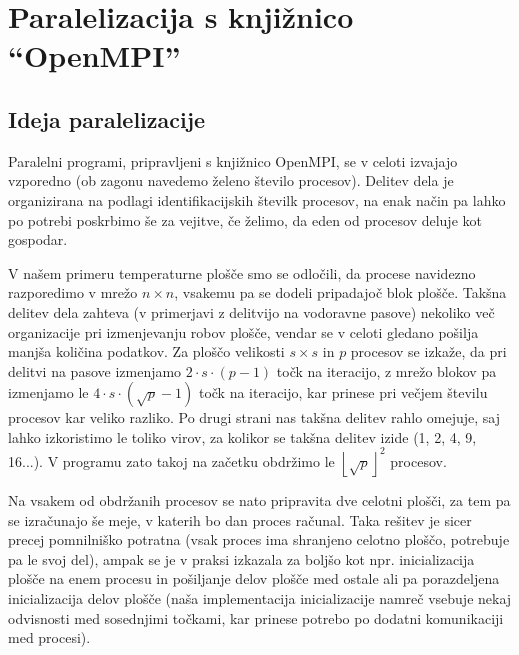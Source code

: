\documentclass[a4paper,titlepage,11pt]{article}
\begin{document}
\pagebreak

\section{Paralelizacija s knjižnico ``OpenMPI''}
\label{poglavje-mpi}

\subsection{Ideja paralelizacije}

Paralelni programi, pripravljeni s knjižnico OpenMPI, se v celoti izvajajo vzporedno (ob zagonu navedemo želeno število procesov). Delitev dela je organizirana na podlagi identifikacijskih številk procesov, na enak način pa lahko po potrebi poskrbimo še za vejitve, če želimo, da eden od procesov deluje kot gospodar.

V našem primeru temperaturne plošče smo se odločili, da procese navidezno razporedimo v mrežo \(n \times n\), vsakemu pa se dodeli pripadajoč blok plošče. Takšna delitev dela zahteva (v primerjavi z delitvijo na vodoravne pasove) nekoliko več organizacije pri izmenjevanju robov plošče, vendar se v celoti gledano pošilja manjša količina podatkov. Za ploščo velikosti \(s \times s\) in \(p\) procesov se izkaže, da pri delitvi na pasove izmenjamo \(2 \cdot s \cdot (p-1)\) točk na iteracijo, z mrežo blokov pa izmenjamo le \(4 \cdot s \cdot (\sqrt{p}-1)\) točk na iteracijo, kar prinese pri večjem številu procesov kar veliko razliko. Po drugi strani nas takšna delitev rahlo omejuje, saj lahko izkoristimo le toliko virov, za kolikor se takšna delitev izide (1, 2, 4, 9, 16...). V programu zato takoj na začetku obdržimo le \(\left \lfloor{\sqrt{p}}\right \rfloor ^ 2\) procesov.

Na vsakem od obdržanih procesov se nato pripravita dve celotni plošči, za tem pa se izračunajo še meje, v katerih bo dan proces računal. Taka rešitev je sicer precej pomnilniško potratna (vsak proces ima shranjeno celotno ploščo, potrebuje pa le svoj del), ampak se je v praksi izkazala za boljšo kot npr. inicializacija plošče na enem procesu in pošiljanje delov plošče med ostale ali pa porazdeljena inicializacija delov plošče (naša implementacija inicializacije namreč vsebuje nekaj odvisnosti med sosednjimi točkami, kar prinese potrebo po dodatni komunikaciji med procesi).
\end{document}

